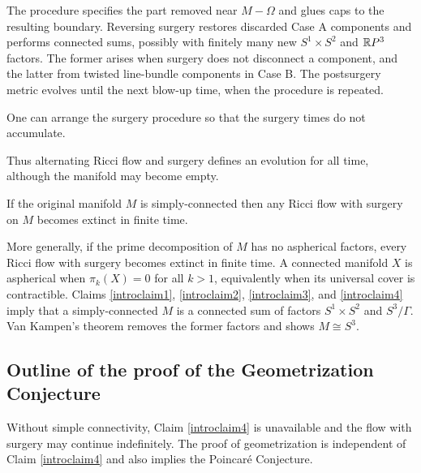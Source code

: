 The procedure specifies the part removed near $M-\Omega$ and glues caps to
the resulting boundary.  Reversing surgery restores discarded Case A
components and performs connected sums, possibly with finitely many new
$S^1\times S^2$ and ${\mathbb R} P^3$ factors.  The former arises when surgery does not
disconnect a component, and the latter from twisted line-bundle components
in Case B.  The postsurgery metric evolves until the next blow-up time, when
the procedure is repeated.

\begin{proposition}
  \label{prop:kl-overview-ricci-flow-approach-manifold-geometrization-ricci-flow-surgery-proposition}
 \cite{Perelman2} \label{introclaim3}
One can arrange the surgery procedure so that the surgery times do not
accumulate.
\end{proposition}

Thus alternating Ricci flow and surgery defines an evolution for all time,
although the manifold may become empty.

\begin{proposition}
  \label{prop:kl-overview-ricci-flow-approach-manifold-geometrization-ricci-flow-surgery-proposition-4}
 \cite{Colding-Minicozzi,Colding-Minicozzi2,Perelman3}
\label{introclaim4}
If the original manifold $M$ is simply-connected then any Ricci flow with
surgery on $M$ becomes extinct in finite time.
\end{proposition}

More generally, if the prime decomposition of $M$ has no aspherical factors,
every Ricci flow with surgery becomes extinct in finite time.  A connected
manifold $X$ is aspherical when $\pi_k(X)=0$ for all $k>1$, equivalently when
its universal cover is contractible.  Claims \ref{introclaim1},
\ref{introclaim2}, \ref{introclaim3}, and \ref{introclaim4} imply that a
simply-connected $M$ is a connected sum of factors $S^1\times S^2$ and
$S^3/\Gamma$.  Van Kampen's theorem removes the former factors and shows
$M\cong S^3$.

\subsection{Outline of the proof of the Geometrization Conjecture}

Without simple connectivity, Claim \ref{introclaim4} is unavailable and the
flow with surgery may continue indefinitely.  The proof of geometrization is
independent of Claim \ref{introclaim4} and also implies the Poincar\'e
Conjecture.

